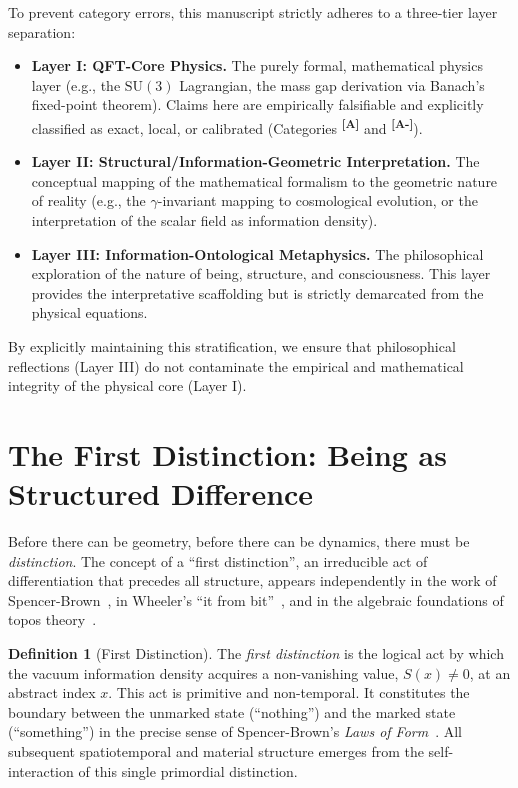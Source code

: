\documentclass[12pt,a4paper,twoside]{article}
\theoremstyle{plain}
\theoremstyle{definition}
\newtheorem{definition}[theorem]{Definition}
\theoremstyle{remark}
\newcommand{\catmark}[1]{\textsuperscript{\textsf{\textbf{[#1]}}}}
\newcommand{\Sx}{S(x)}
\begin{document}
To prevent category errors, this manuscript strictly adheres to a three-tier layer separation:
\begin{itemize}
    \item \textbf{Layer I: QFT-Core Physics.} The purely formal, mathematical physics layer (e.g., the $\mathrm{SU}(3)$ Lagrangian, the mass gap derivation via Banach's fixed-point theorem). Claims here are empirically falsifiable and explicitly classified as exact, local, or calibrated (Categories \catmark{A} and \catmark{A-}).
    \item \textbf{Layer II: Structural/Information-Geometric Interpretation.} The conceptual mapping of the mathematical formalism to the geometric nature of reality (e.g., the $\gamma$-invariant mapping to cosmological evolution, or the interpretation of the scalar field as information density).
    \item \textbf{Layer III: Information-Ontological Metaphysics.} The philosophical exploration of the nature of being, structure, and consciousness. This layer provides the interpretative scaffolding but is strictly demarcated from the physical equations.
\end{itemize}

By explicitly maintaining this stratification, we ensure that philosophical reflections (Layer III) do not contaminate the empirical and mathematical integrity of the physical core (Layer I).

\newpage

\section{The First Distinction: Being as Structured Difference}
\label{sec:first-distinction}

Before there can be geometry, before there can be dynamics, there must be
\emph{distinction}. The concept of a ``first distinction'', an irreducible
act of differentiation that precedes all structure, appears independently in
the work of Spencer-Brown~\cite{SpencerBrown1969}, in Wheeler's ``it from
bit''~\cite{Wheeler1990}, and in the algebraic foundations of topos
theory~\cite{Lawvere1964}.

\begin{definition}[First Distinction]
\label{def:first-distinction}
The \emph{first distinction} is the logical act by which the vacuum information
density acquires a non-vanishing value, $\Sx \neq 0$, at an abstract index $x$.
This act is primitive and non-temporal. It constitutes the boundary between the
unmarked state (``nothing'') and the marked state (``something'') in the precise
sense of Spencer-Brown's \emph{Laws of Form}~\cite{SpencerBrown1969}. All
subsequent spatiotemporal and material structure emerges from the
self-interaction of this single primordial distinction.
\end{definition}
\end{document}
